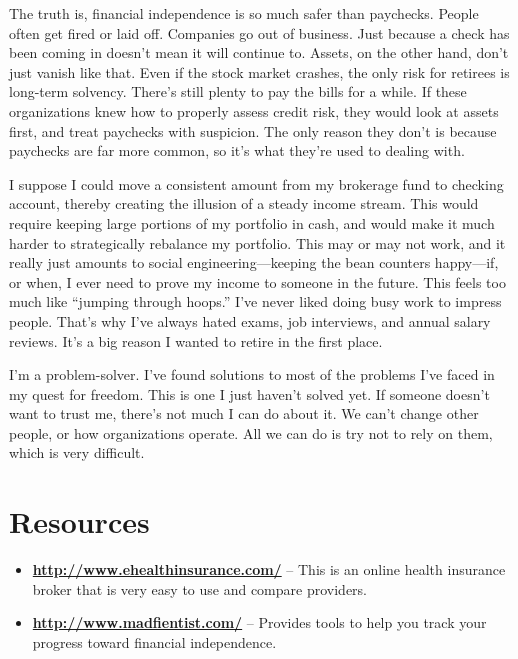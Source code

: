 The truth is, financial independence is so much safer than paychecks. People often get fired or laid off. Companies go out of business. Just because a check has been coming in doesn't mean it will continue to. Assets, on the other hand, don't just vanish like that. Even if the stock market crashes, the only risk for retirees is long-term solvency. There's still plenty to pay the bills for a while. If these organizations knew how to properly assess credit risk, they would look at assets first, and treat paychecks with suspicion. The only reason they don't is because paychecks are far more common, so it's what they're used to dealing with.

I suppose I could move a consistent amount from my brokerage fund to checking account, thereby creating the illusion of a steady income stream. This would require keeping large portions of my portfolio in cash, and would make it much harder to strategically rebalance my portfolio. This may or may not work, and it really just amounts to social engineering---keeping the bean counters happy---if, or when, I ever need to prove my income to someone in the future. This feels too much like ``jumping through hoops.'' I've never liked doing busy work to impress people. That's why I've always hated exams, job interviews, and annual salary reviews. It's a big reason I wanted to retire in the first place.

I'm a problem-solver. I've found solutions to most of the problems I've faced in my quest for freedom. This is one I just haven't solved yet. If someone doesn't want to trust me, there's not much I can do about it. We can't change other people, or how organizations operate. All we can do is try not to rely on them, which is very difficult.

\newpage
\section{Resources}
\begin{itemize}
\item \textbf{\url{http://www.ehealthinsurance.com/}} -- This is an online health insurance broker that is very easy to use and compare providers. 
\item \textbf{\url{http://www.madfientist.com/}} -- Provides tools to help you track your progress toward financial independence.
\end{itemize}
